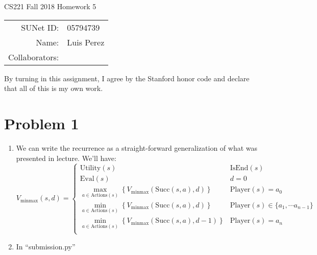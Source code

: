 \documentclass[12pt]{article}
\begin{document}
\begin{center}
{\Large CS221 Fall 2018 Homework 5}

\begin{tabular}{rl}
SUNet ID: & 05794739 \\
Name: & Luis Perez \\
Collaborators: &
\end{tabular}
\end{center}

By turning in this assignment, I agree by the Stanford honor code and declare
that all of this is my own work.

\section*{Problem 1}


\begin{enumerate}[label=(\alph*)]
  \item We can write the recurrence as a straight-forward generalization of what was presented in lecture. We'll have:
  $$
    V_{\text{minmax}}(s,d) =
      \begin{cases}
        \text{Utility}(s) & \text{IsEnd}(s) \\
        \text{Eval}(s) & d = 0 \\
        \max_{a \in \text{Actions}(s)} \left\{ V_{\text{minmax}}(\text{Succ}(s, a), d)\right\} & \text{Player}(s) = a_0 \\
        \min_{a \in \text{Actions}(s)} \left\{ V_{\text{minmax}}(\text{Succ}(s, a), d)\right\} & \text{Player}(s) \in \{ a_1, \cdots a_{n-1}\} \\
        \min_{a \in \text{Actions}(s)} \left\{ V_{\text{minmax}}(\text{Succ}(s, a), d - 1)\right\} & \text{Player}(s) = a_n \\
      \end{cases}
  $$
  \item In ``submission.py''
\end{enumerate}
\end{document}

